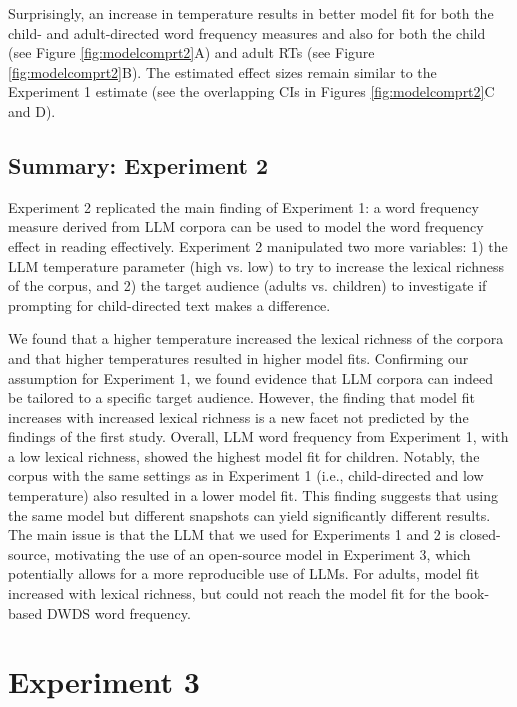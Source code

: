 \documentclass[doc, a4paper, anonymous]{apa7}
\begin{document}
Surprisingly, an increase in temperature results in better model fit for both the child- and adult-directed word frequency measures and also for both the child (see Figure \ref{fig:modelcomprt2}A) and adult RTs (see Figure \ref{fig:modelcomprt2}B). The estimated effect sizes remain similar to the Experiment 1 estimate (see the overlapping CIs in Figures \ref{fig:modelcomprt2}C and D). 


\subsection*{Summary: Experiment 2}

Experiment 2 replicated the main finding of Experiment 1: a word frequency measure derived from LLM corpora can be used to model the word frequency effect in reading effectively. Experiment 2 manipulated two more variables: 1) the LLM temperature parameter (high vs. low) to try to increase the lexical richness of the corpus, and 2) the target audience (adults vs. children) to investigate if prompting for child-directed text makes a difference.  

We found that a higher temperature increased the lexical richness of the corpora and that higher temperatures resulted in higher model fits. Confirming our assumption for Experiment 1, we found evidence that LLM corpora can indeed be tailored to a specific target audience. However, the finding that model fit increases with increased lexical richness is a new facet not predicted by the findings of the first study. Overall, LLM word frequency from Experiment 1, with a low lexical richness, showed the highest model fit for children. Notably, the corpus with the same settings as in Experiment 1 (i.e., child-directed and low temperature) also resulted in a lower model fit. This finding suggests that using the same model but different snapshots can yield significantly different results. The main issue is that the LLM that we used for Experiments 1 and 2 is closed-source, motivating the use of an open-source model in Experiment 3, which potentially allows for a more reproducible use of LLMs. For adults, model fit increased with lexical richness, but could not reach the model fit for the book-based DWDS word frequency.

\section{Experiment 3}
\end{document}
